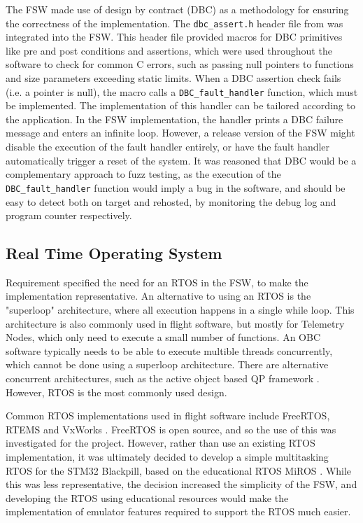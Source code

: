 \documentclass[../report.tex]{subfiles}
\begin{document}
The FSW made use of design by contract (DBC) as a methodology for ensuring the
correctness of the implementation. The \lstinline|dbc_assert.h| header file
from \citet{dbc_assert} was integrated into the FSW. This header file provided
macros for DBC primitives like pre and post conditions and assertions, which
were used throughout the software to check for common C errors, such as passing
null pointers to functions and size parameters exceeding static limits. When a
DBC assertion check fails (i.e. a pointer is null), the macro calls a
\lstinline|DBC_fault_handler| function, which must be implemented. The
implementation of this handler can be tailored according to the application. In
the FSW implementation, the handler prints a DBC failure message and enters an
infinite loop. However, a release version of the FSW might disable the
execution of the fault handler entirely, or have the fault handler
automatically trigger a reset of the system. It was reasoned that DBC would be
a complementary approach to fuzz testing, as the execution of the
\lstinline|DBC_fault_handler| function would imply a bug in the software, and
should be easy to detect both on target and rehosted, by monitoring the debug
log and program counter respectively.

\subsection{Real Time Operating System}

Requirement  specified the need for an RTOS in the FSW, to make
the implementation representative. An alternative to using an RTOS is the
"superloop" architecture, where all execution happens in a single while loop.
This architecture is also commonly used in flight software, but mostly for
Telemetry Nodes, which only need to execute a small number of functions. An OBC
software typically needs to be able to execute multible threads concurrently,
which cannot be done using a superloop architecture. There are alternative
concurrent architectures, such as the active object based QP framework
\citep{QP}. However, RTOS is the most commonly used design.

Common RTOS implementations used in flight software include FreeRTOS, RTEMS and
VxWorks \citep{Cratere_2024}. FreeRTOS is open source, and so the use of this
was investigated for the project. However, rather than use an existing RTOS
implementation, it was ultimately decided to develop a simple multitasking RTOS
for the STM32 Blackpill, based on the educational RTOS MiROS \citep{miros}.
While this was less representative, the decision increased the simplicity of
the FSW, and developing the RTOS using educational resources would make the
implementation of emulator features required to support the RTOS much easier.
\end{document}
